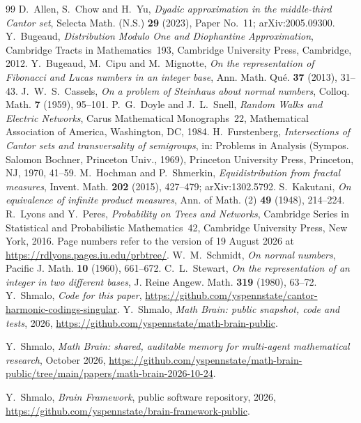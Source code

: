 \documentclass[11pt]{amsart}
\theoremstyle{remark}
\begin{document}
\begin{thebibliography}{99}
 D.~Allen, S.~Chow and H.~Yu, \emph{Dyadic approximation in the middle-third Cantor set}, Selecta Math. (N.S.) \textbf{29} (2023), Paper No.~11; arXiv:2005.09300.
 Y.~Bugeaud, \emph{Distribution Modulo One and Diophantine Approximation}, Cambridge Tracts in Mathematics~193, Cambridge University Press, Cambridge, 2012.
 Y.~Bugeaud, M.~Cipu and M.~Mignotte, \emph{On the representation of Fibonacci and Lucas numbers in an integer base}, Ann. Math. Qu\'e. \textbf{37} (2013), 31--43.
 J.~W.~S.~Cassels, \emph{On a problem of Steinhaus about normal numbers}, Colloq. Math. \textbf{7} (1959), 95--101.
 P.~G.~Doyle and J.~L.~Snell, \emph{Random Walks and Electric Networks}, Carus Mathematical Monographs~22, Mathematical Association of America, Washington, DC, 1984.
 H.~Furstenberg, \emph{Intersections of Cantor sets and transversality of semigroups}, in: Problems in Analysis (Sympos. Salomon Bochner, Princeton Univ., 1969), Princeton University Press, Princeton, NJ, 1970, 41--59.
 M.~Hochman and P.~Shmerkin, \emph{Equidistribution from fractal measures}, Invent. Math. \textbf{202} (2015), 427--479; arXiv:1302.5792.
 S.~Kakutani, \emph{On equivalence of infinite product measures}, Ann. of Math. (2) \textbf{49} (1948), 214--224.
 R.~Lyons and Y.~Peres, \emph{Probability on Trees and Networks}, Cambridge Series in Statistical and Probabilistic Mathematics~42, Cambridge University Press, New York, 2016. Page numbers refer to the version of 19 August 2026 at \url{https://rdlyons.pages.iu.edu/prbtree/}.
 W.~M.~Schmidt, \emph{On normal numbers}, Pacific J. Math. \textbf{10} (1960), 661--672.
 C.~L.~Stewart, \emph{On the representation of an integer in two different bases}, J. Reine Angew. Math. \textbf{319} (1980), 63--72.
 Y.~Shmalo, \emph{Code for this paper}, \url{https://github.com/yspennstate/cantor-harmonic-codings-singular}.
 Y.~Shmalo, \emph{Math Brain: public snapshot, code and tests}, 2026, \url{https://github.com/yspennstate/math-brain-public}.

 Y.~Shmalo, \emph{Math Brain: shared, auditable memory for multi-agent mathematical research}, October 2026, \url{https://github.com/yspennstate/math-brain-public/tree/main/papers/math-brain-2026-10-24}.

 Y.~Shmalo, \emph{Brain Framework}, public software repository, 2026, \url{https://github.com/yspennstate/brain-framework-public}.

\end{thebibliography}
\end{document}
